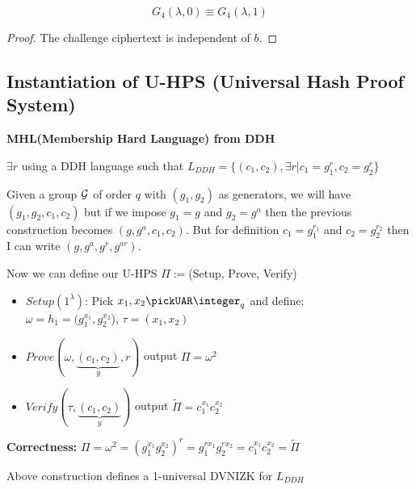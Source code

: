 \begin{lemma}
    \[
        G_{4}(\lambda, 0)\equiv G_{4}(\lambda, 1)   
    \]
\end{lemma}
\begin{proof}
    The challenge ciphertext is independent of $b$.
\end{proof}






\subsection{Instantiation of U-HPS (Universal Hash Proof System)}
\textbf{MHL(Membership Hard Language) from DDH}

$\exists r$ using a DDH language such that $L_{DDH}=\{(c_1,c_2), \exists r | c_1=g_1^r, c_2=g_2^r\}$

Given a group $\mathcal{G}$ of order $q$ with $(g_1,g_2)$ as generators, we will have $(g_1,g_2,c_1,c_2)$ but if we impose $g_1=g$ and $g_2=g^a$ then the previous construction becomes $(g,g^a,c_1,c_2)$. But for definition $c_1=g_1^{r_1}$ and $c_2=g_2^{r_2}$ then I can write $(g,g^a,g^r,g^{ar})$.

Now we can define our U-HPS $\Pi:=$(Setup, Prove, Verify)

\begin{itemize}
    \item $Setup(1^\lambda)$: Pick $x_1,x_2 \pickUAR \integer_q$ and define:\\ $\omega=h_1=(g_1^{x_1},g_2^{x_2}$), $\tau=(x_1,x_2)$
    \item $Prove(\omega, \underbrace{(c_1,c_2)}_{y}, r)$ output $\Pi=\omega^2$
    \item $Verify(\tau, \underbrace{(c_1,c_2)}_{y})$ output $\widetilde{\Pi}=c_1^{x_1}c_2^{x_2}$ %
\end{itemize}

\textbf{Correctness:} $\Pi=\omega^2=(g_1^{x_1}g_2^{x_2})^r=g_1^{rx_1}g_2^{rx_2}=c_1^{x_1}c_2^{x_2}=\widetilde{\Pi}$

\begin{theorem}
    Above construction defines a 1-universal DVNIZK for $L_{DDH}$
\end{theorem}

